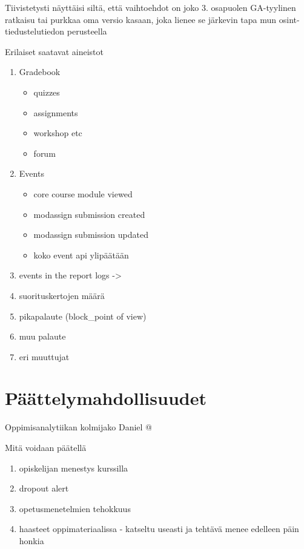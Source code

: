Tiivistetysti näyttäisi siltä, että vaihtoehdot on joko 3. osapuolen GA-tyylinen ratkaisu tai purkkaa oma versio kasaan, joka lienee se järkevin tapa mun osint-tiedustelutiedon perusteella


Erilaiset saatavat aineistot
\begin{enumerate}
    \item Gradebook
        \begin{itemize}
            \item quizzes
            \item assignments
            \item workshop etc
            \item forum
        \end{itemize}
    \item Events
        \begin{itemize}
            \item core course module viewed
            \item modassign submission created
            \item modassign submission updated
            \item koko event api ylipäätään
        \end{itemize}
    \item events in the report logs -> \cite{agudo-peregrinaCanWePredict2014}
    \item suorituskertojen määrä
    \item pikapalaute (block\_point of view)
    \item muu palaute
    \item eri muuttujat \citep{mwalumbweUsingLearningAnalytics2017}
\end{enumerate}

\section{Päättelymahdollisuudet}

Oppimisanalytiikan kolmijako Daniel @ \cite{eoppimiskeskusOppimisanalytiikkaTuleeOletko2017} %

Mitä voidaan päätellä
\begin{enumerate}
    \item opiskelijan menestys kurssilla
    \item dropout alert
    \item opetusmenetelmien tehokkuus
    \item haasteet oppimateriaalissa - katseltu useasti ja tehtävä menee edelleen päin honkia
\end{enumerate}
